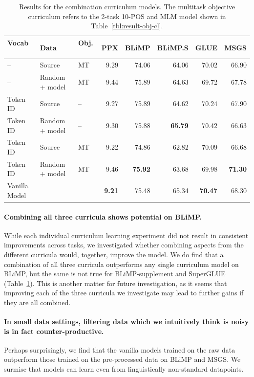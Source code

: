 \begin{table}
    \centering
    \small
    \begin{tabular}{lll|rrrrr}
    \toprule
    Vocab \ & Data \ & Obj. \ & PPX & BLiMP & BLiMP.S & GLUE & MSGS  \\
    \midrule
    -- & Source & MT &                           9.29& 74.06 & 64.06 & 70.02 & 66.90 \\
    -- & Random + model & MT &                9.44& 75.89 & 64.63 & 69.72 & 67.78 \\
    Token ID & Source & -- &                     
     9.27& 75.89 & 64.62 & 70.24 & 67.90 \\
    Token ID & Random + model & -- &
        9.30& 75.88 & \textbf{65.79} & 70.42 & 66.63 \\
    Token ID & Source & MT &
         9.22 & 74.86 & 62.82 & 70.09 & 66.68 \\
    Token ID & Random + model & MT & 9.46& \textbf{75.92} & 63.68 & 69.98 & \textbf{71.30} \\
    \midrule
    Vanilla Model & & & \textbf{9.21} & 75.48 & 65.34 & \textbf{70.47} & 68.30 \\
    \bottomrule
    \end{tabular}
    \caption{\label{tbl:result-combination-cl} Results for the combination curriculum models. The multitask objective curriculum refers to the 2-task 10-POS and MLM model shown in Table~\ref{tbl:result-obj-cl}. }
\end{table}

\paragraph{Combining all three curricula shows potential on BLiMP.}
While each individual curriculum learning experiment did not result in consistent improvements across tasks, we investigated whether combining aspects from the different curricula would, together, improve the model.
We do find that a combination of all three curricula outperforms any single curriculum model on BLiMP, but the same is not true for BLiMP-supplement and SuperGLUE (Table~\ref{tbl:result-combination-cl}). This is another matter for future investigation, as it seems that improving each of the three curricula we investigate may lead to further gains if they are all combined.


\paragraph{In small data settings, filtering data which we intuitively think is noisy is in fact counter-productive.} Perhaps surprisingly, we find that the vanilla models trained on the raw data outperform those trained on the pre-processed data on BLiMP and MSGS. We surmise that models can learn even from linguistically non-standard datapoints.

